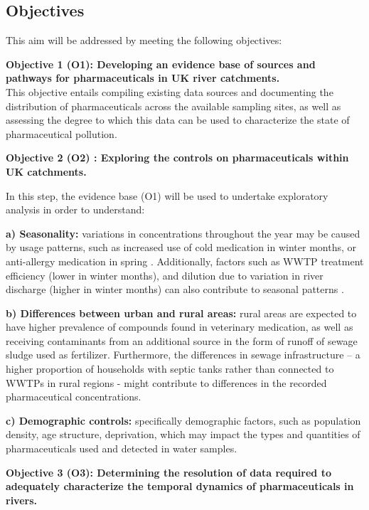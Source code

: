 \documentclass{article}
\begin{document}
\subsection{Objectives}
This aim will be addressed by meeting the following objectives:

\textbf{Objective 1 (O1): Developing an evidence base of sources and pathways for pharmaceuticals in UK river catchments. }\\
This objective entails compiling existing data sources and documenting the distribution of pharmaceuticals across the available sampling sites, as well as assessing the degree to which this data can be used to characterize the state of pharmaceutical pollution.

\vspace{5mm}
\textbf{Objective 2 (O2) : Exploring the controls on pharmaceuticals within UK catchments.}

In this step, the evidence base (O1) will be used to undertake exploratory analysis in order to understand:

\textbf{a) Seasonality:} variations in concentrations throughout the year may be caused by usage patterns, such as increased use of cold medication in winter months, or anti-allergy medication in spring \citep{Vatovec2016InvestigatingSetting}. Additionally, factors such as WWTP treatment efficiency (lower in winter months), and dilution due to variation in river discharge (higher in winter months) can also contribute to  seasonal patterns \citep{Comber2020SeasonalWaters}.

\textbf{b) Differences between urban and rural areas:} rural areas are expected to have higher prevalence of compounds found in veterinary medication, as well as receiving contaminants from an additional source in the form of runoff of sewage sludge used as fertilizer. Furthermore, the differences in sewage infrastructure – a higher proportion of households with septic tanks rather than connected to WWTPs in rural regions - might contribute to differences in the recorded pharmaceutical concentrations.

\textbf{c) Demographic controls:} specifically demographic factors, such as population density, age structure, deprivation, which may impact the types and quantities of pharmaceuticals used and detected in water samples.


\vspace{5mm}
\textbf{Objective 3 (O3): Determining the resolution of data required to adequately characterize the temporal dynamics of pharmaceuticals in rivers.}
\end{document}
